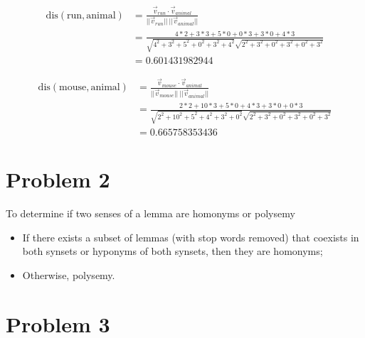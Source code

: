 \documentclass[twoside,11pt]{homework}
\begin{document}
\begin{itemize}
  \[
  \begin{aligned}
  \text{dis}(\text{run}, \text{animal})
  &= \frac{\vec{v}_{run} \cdot \vec{v}_{animal}}{||\vec{v}_{run}|| \ ||\vec{v}_{animal}||}\\
  &= \frac{4*2 + 3*3 + 5*0 + 0*3 + 3*0 + 4*3}{ \sqrt{4^2+3^2+5^2+0^2+3^2+4^2}
    \sqrt{2^2+3^2+0^2+3^2+0^2+3^2}}\\
  &= 0.601431982944 
  \end{aligned}
  \]

  \[
  \begin{aligned}
  \text{dis}(\text{mouse}, \text{animal})
  &= \frac{\vec{v}_{mouse} \cdot \vec{v}_{animal}}{||\vec{v}_{mouse}|| \ ||\vec{v}_{animal}||}\\
  &= \frac{2*2 + 10*3 + 5*0 + 4*3 + 3*0 + 0*3}{ \sqrt{2^2+10^2+5^2+4^2+3^2+0^2}
    \sqrt{2^2+3^2+0^2+3^2+0^2+3^2}}\\
  &= 0.665758353436 
  \end{aligned}
  \]

\end{itemize}

\section*{Problem 2}
To determine if two senses of a lemma are homonyms or polysemy
\begin{itemize}
\item If there exists a subset of lemmas (with stop words removed) that coexists
  in both synsets or hyponyms of both synsets, then they are homonyms;
\item Otherwise, polysemy.
\end{itemize}

\section*{Problem 3}
\end{document}
